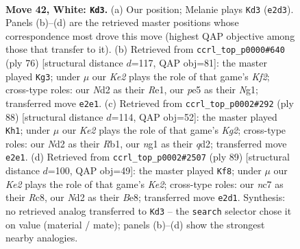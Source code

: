 \documentclass[11pt]{article}
\begin{document}
\clearpage

\begin{figure}[p]\centering
\begin{subfigure}{0.46\textwidth}\centering
\resizebox{\linewidth}{!}{%
\newchessgame
\chessboard[
  setfen={1r3bk1/1rn2p2/2Q5/4p3/R3P3/4B3/3NKRN1/6nq w - - 8 42},
  showmover=false,
  pgfstyle=straightmove, color=movearrow, markmove={e2-d3}
]}
\caption{}
\end{subfigure}\hfill
\begin{subfigure}{0.46\textwidth}\centering
\resizebox{\linewidth}{!}{%
\newchessgame
\chessboard[
  setfen={3r2k1/2R2p2/6pp/1b6/6P1/5B2/1r2PK1P/3nR1N1 w - - 2 39},
  showmover=false,
  pgfstyle=straightmove, color=movearrow, markmove={f2-g3}
]}
\caption{}
\end{subfigure}
\\[4pt]
\begin{subfigure}{0.46\textwidth}\centering
\resizebox{\linewidth}{!}{%
\newchessgame
\chessboard[
  setfen={8/r3rbk1/1Rp5/2P2Q2/3p1P2/5BP1/3q2K1/1R6 w - - 1 45},
  showmover=false,
  pgfstyle=straightmove, color=movearrow, markmove={g2-h1}
]}
\caption{}
\end{subfigure}\hfill
\begin{subfigure}{0.46\textwidth}\centering
\resizebox{\linewidth}{!}{%
\newchessgame
\chessboard[
  setfen={2r1b3/4k2R/3rp3/1p6/1PnN1n2/P7/4B3/B2RK3 b - - 1 45},
  showmover=false,
  pgfstyle=straightmove, color=movearrow, markmove={e7-f8}
]}
\caption{}
\end{subfigure}
\caption{\textbf{Move 42, White: \texttt{Kd3}.} (a) Our position; Melanie plays \texttt{Kd3} (\texttt{e2d3}). Panels (b)--(d) are the retrieved master positions whose correspondence most drove this move (highest QAP objective among those that transfer to it). (b) Retrieved from \texttt{ccrl\_top\_p0000\#640} (ply 76) [structural distance $d$=117, QAP obj=81]: the master played \texttt{Kg3}; under $\mu$ our \emph{Ke2} plays the role of that game's \emph{Kf2}; cross-type roles: our \emph{N}d2 as their \emph{R}e1, our \emph{p}e5 as their \emph{N}g1; transferred move \texttt{e2e1}. (c) Retrieved from \texttt{ccrl\_top\_p0002\#292} (ply 88) [structural distance $d$=114, QAP obj=52]: the master played \texttt{Kh1}; under $\mu$ our \emph{Ke2} plays the role of that game's \emph{Kg2}; cross-type roles: our \emph{N}d2 as their \emph{R}b1, our \emph{n}g1 as their \emph{q}d2; transferred move \texttt{e2e1}. (d) Retrieved from \texttt{ccrl\_top\_p0002\#2507} (ply 89) [structural distance $d$=100, QAP obj=49]: the master played \texttt{Kf8}; under $\mu$ our \emph{Ke2} plays the role of that game's \emph{Ke2}; cross-type roles: our \emph{n}c7 as their \emph{R}c8, our \emph{N}d2 as their \emph{B}e8; transferred move \texttt{e2d1}. Synthesis: no retrieved analog transferred to \texttt{Kd3} -- the \texttt{search} selector chose it on value (material / mate); panels (b)--(d) show the strongest nearby analogies.}
\label{fig:thought-m82}
\end{figure}
\end{document}
